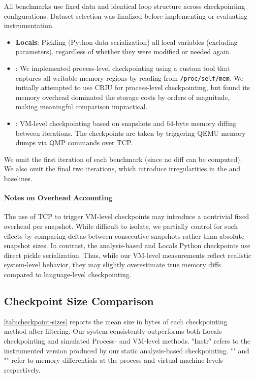 All benchmarks use fixed data and identical loop structure across checkpointing configurations. Dataset selection was finalized before implementing or evaluating instrumentation.

\begin{itemize}
  \item \textbf{Locals}: Pickling (Python data serialization) all local variables (excluding parameters), regardless of whether they were modified or needed again.
  \item \textbf{\PROCDIFF}: We implemented process-level checkpointing using a custom tool that captures all writable memory regions by reading from \texttt{/proc/self/mem}. We initially attempted to use CRIU for process-level checkpointing, but found its memory overhead dominated the storage costs by orders of magnitude, making meaningful comparison impractical. 
  \item \textbf{\VMDIFF}: VM-level checkpointing based on snapshots and 64-byte memory diffing between iterations. The checkpoints are taken by triggering QEMU memory dumps via QMP commands over TCP.
\end{itemize}

We omit the first iteration of each benchmark (since no diff can be computed). We also omit the final two iterations, which introduce irregularities in the {\PROCDIFF} and {\VMDIFF} baselines.

\paragraph{Notes on Overhead Accounting}
The use of TCP to trigger VM-level checkpoints may introduce a nontrivial fixed overhead per snapshot. While difficult to isolate, we partially control for such effects by comparing deltas between consecutive snapshots rather than absolute snapshot sizes. In contrast, the analysis-based and Locals Python checkpoints use direct pickle serialization. Thus, while our VM-level measurements reflect realistic system-level behavior, they may slightly overestimate true memory diffs compared to language-level checkpointing.

\subsection{Checkpoint Size Comparison}

\autoref{tab:checkpoint-sizes} reports the mean size in bytes of each checkpointing method after filtering. Our system consistently outperforms both Locals checkpointing and simulated Process- and VM-level methods. "Instr" refers to the instrumented version produced by our static analysis-based checkpointing. "\PROCDIFF" and "\VMDIFF" refer to memory differentials at the process and virtual machine levels respectively.

